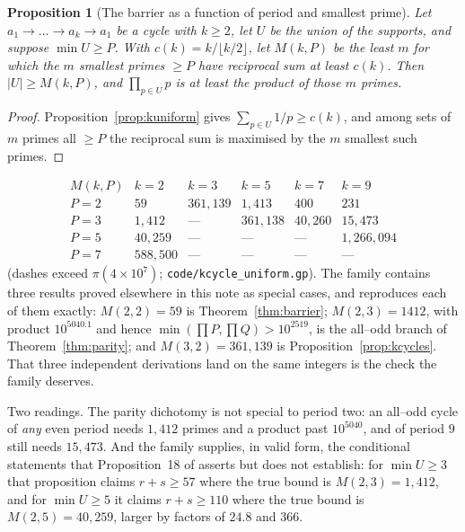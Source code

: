 \documentclass[11pt]{article}
\newtheorem{proposition}[theorem]{Proposition}
\theoremstyle{definition}
\begin{document}
\begin{proposition}[The barrier as a function of period and smallest prime]\label{prop:twoparam}
Let $a_1\to\dots\to a_k\to a_1$ be a cycle with $k\ge2$, let $U$ be the union of the supports, and
suppose $\min U\ge P$. With $c(k)=k/\lfloor k/2\rfloor$, let $M(k,P)$ be the least $m$ for which the
$m$ smallest primes $\ge P$ have reciprocal sum at least $c(k)$. Then $|U|\ge M(k,P)$, and
$\prod_{p\in U}p$ is at least the product of those $m$ primes.
\end{proposition}
\begin{proof}
Proposition~\ref{prop:kuniform} gives $\sum_{p\in U}1/p\ge c(k)$, and among sets of $m$ primes all
$\ge P$ the reciprocal sum is maximised by the $m$ smallest such primes.
\end{proof}

\[
\begin{array}{l|ccccc}
M(k,P) & k=2 & k=3 & k=5 & k=7 & k=9\\\hline
P=2 & 59 & 361{,}139 & 1{,}413 & 400 & 231\\
P=3 & 1{,}412 & \text{---} & 361{,}138 & 40{,}260 & 15{,}473\\
P=5 & 40{,}259 & \text{---} & \text{---} & \text{---} & 1{,}266{,}094\\
P=7 & 588{,}500 & \text{---} & \text{---} & \text{---} & \text{---}
\end{array}
\]
(dashes exceed $\pi(4\times10^{7})$; \texttt{code/kcycle\_uniform.gp}). The family contains three
results proved elsewhere in this note as special cases, and reproduces each of them exactly:
$M(2,2)=59$ is Theorem~\ref{thm:barrier}; $M(2,3)=1412$, with product $10^{5040.1}$ and hence
$\min(\prod P,\prod Q)>10^{2519}$, is the all--odd branch of Theorem~\ref{thm:parity}; and
$M(3,2)=361{,}139$ is Proposition~\ref{prop:kcycles}. That three independent derivations land on the
same integers is the check the family deserves.

Two readings. The parity dichotomy is not special to period two: an all--odd cycle of \emph{any} even
period needs $1{,}412$ primes and a product past $10^{5040}$, and of period $9$ still needs
$15{,}473$. And the family supplies, in valid form, the conditional statements that
Proposition~18 of \cite{Kovic2012} asserts but does not establish: for $\min U\ge3$ that proposition
claims $r+s\ge57$ where the true bound is $M(2,3)=1{,}412$, and for $\min U\ge5$ it claims
$r+s\ge110$ where the true bound is $M(2,5)=40{,}259$, larger by factors of $24.8$ and $366$.
\end{document}
